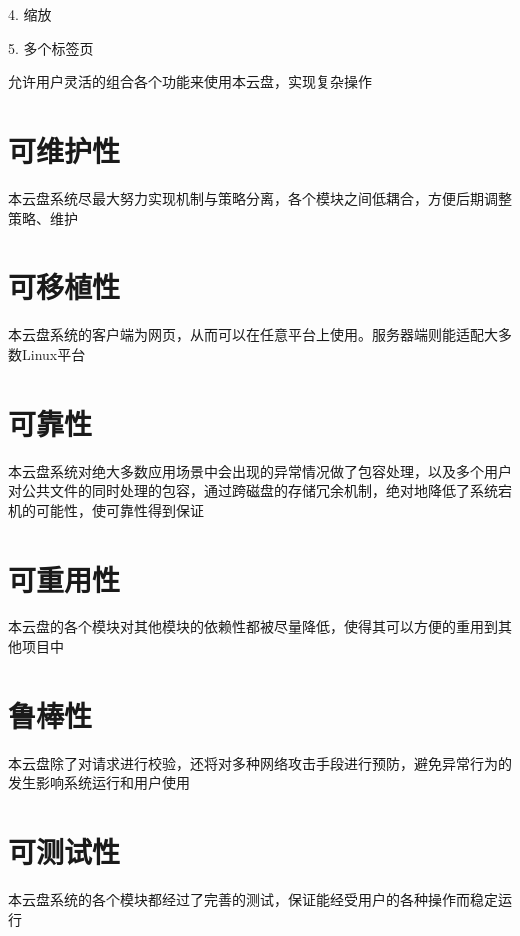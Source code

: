 4. 缩放

5. 多个标签页

允许用户灵活的组合各个功能来使用本云盘，实现复杂操作

\section{可维护性}

本云盘系统尽最大努力实现机制与策略分离，各个模块之间低耦合，方便后期调整策略、维护

\section{可移植性}

本云盘系统的客户端为网页，从而可以在任意平台上使用。服务器端则能适配大多数Linux平台

\section{可靠性}

本云盘系统对绝大多数应用场景中会出现的异常情况做了包容处理，以及多个用户对公共文件的同时处理的包容，通过跨磁盘的存储冗余机制，绝对地降低了系统宕机的可能性，使可靠性得到保证
 
\section{可重用性}

本云盘的各个模块对其他模块的依赖性都被尽量降低，使得其可以方便的重用到其他项目中

\section{鲁棒性}

本云盘除了对请求进行校验，还将对多种网络攻击手段进行预防，避免异常行为的发生影响系统运行和用户使用

\section{可测试性}

本云盘系统的各个模块都经过了完善的测试，保证能经受用户的各种操作而稳定运行
